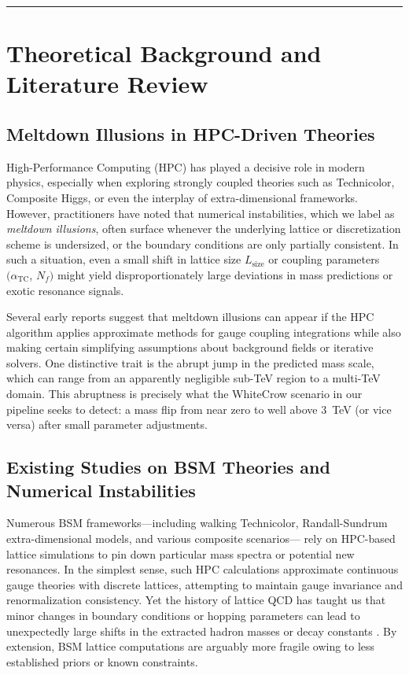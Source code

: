 \documentclass[11pt]{article}
\begin{document}
\noindent\rule{\textwidth}{0.5pt}

\section{Theoretical Background and Literature Review}
\label{sec:background}

\subsection{Meltdown Illusions in HPC-Driven Theories}

High-Performance Computing (HPC) has played a decisive role in modern physics,
especially when exploring strongly coupled theories such as Technicolor, 
Composite Higgs, or even the interplay of extra-dimensional frameworks. 
However, practitioners have noted that numerical instabilities, 
which we label as \textit{meltdown illusions}, often surface whenever 
the underlying lattice or discretization scheme is undersized, 
or the boundary conditions are only partially consistent. 
In such a situation, even a small shift in lattice size $L_{\mathrm{size}}$ 
or coupling parameters $(\alpha_{\mathrm{TC}}$, $N_f)$
might yield disproportionately large deviations in mass predictions 
or exotic resonance signals.

Several early reports \cite{atlas, meltdownRef} 
suggest that meltdown illusions can appear if the HPC algorithm 
applies approximate methods for gauge coupling integrations 
while also making certain simplifying assumptions about 
background fields or iterative solvers. One distinctive trait is 
the abrupt jump in the predicted mass scale, which can range 
from an apparently negligible sub-TeV region to a multi-TeV domain. 
This abruptness is precisely what the WhiteCrow scenario in our pipeline 
seeks to detect: a mass flip from near zero to well above 3~TeV 
(or vice versa) after small parameter adjustments.

\subsection{Existing Studies on BSM Theories and Numerical Instabilities}

Numerous BSM frameworks---including walking Technicolor, 
Randall-Sundrum extra-dimensional models, and various composite scenarios---%
rely on HPC-based lattice simulations to pin down 
particular mass spectra or potential new resonances. 
In the simplest sense, such HPC calculations approximate 
continuous gauge theories with discrete lattices, 
attempting to maintain gauge invariance and 
renormalization consistency. Yet the history of lattice QCD 
has taught us that minor changes in boundary conditions 
or hopping parameters can lead to unexpectedly large shifts 
in the extracted hadron masses or decay constants \cite{qcdLatticeRef}. 
By extension, BSM lattice computations are arguably more fragile 
owing to less established priors or known constraints.
\end{document}
